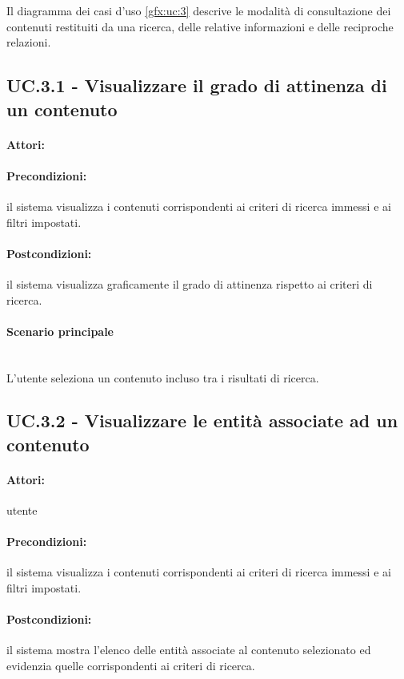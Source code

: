 \documentclass[10pt,a4paper,headinclude,footinclude,hidelinks]{scrreprt} %
\begin{document}
	Il diagramma dei casi d'uso \ref{gfx:uc:3} descrive le modalità di consultazione dei contenuti restituiti da una ricerca, delle relative informazioni e delle reciproche relazioni.

	\subsection[UC.3.1]{UC.3.1 - Visualizzare il grado di attinenza di un contenuto}
	\label{sec:stage:ar:uc:3_1}
	\paragraph{Attori:}
	\paragraph{Precondizioni:} il sistema visualizza i contenuti corrispondenti ai criteri di ricerca immessi e ai filtri impostati.
	\paragraph{Postcondizioni:} il sistema visualizza graficamente il grado di attinenza rispetto ai criteri di ricerca.
	\paragraph{Scenario principale} \hfill \\
	L'utente seleziona un contenuto incluso tra i risultati di ricerca.

	\subsection[UC.3.2]{UC.3.2 - Visualizzare le entità associate ad un contenuto}
	\label{sec:stage:ar:uc:3_2}
	\paragraph{Attori:} utente
	\paragraph{Precondizioni:} il sistema visualizza i contenuti corrispondenti ai criteri di ricerca immessi e ai filtri impostati.
	\paragraph{Postcondizioni:} il sistema mostra l'elenco delle entità associate al contenuto selezionato ed evidenzia quelle corrispondenti ai criteri di ricerca.
\end{document}
